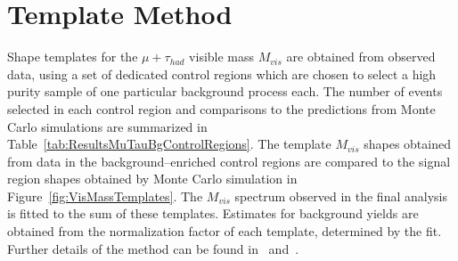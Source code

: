 \section{Template Method}
\label{sec:template}
%
Shape templates for the $\mu + \tau_{had}$ visible mass $M_{vis}$ are obtained
from observed data, using a set of dedicated control regions which are chosen to select a
high purity sample of one particular background process each.  The number of
events selected in each control region and comparisons to the predictions from
Monte Carlo simulations are summarized in
Table~\ref{tab:ResultsMuTauBgControlRegions}.  The template $M_{vis}$ shapes
obtained from data in the background--enriched control regions are compared to
the signal region shapes obtained by Monte Carlo simulation in
Figure~\ref{fig:VisMassTemplates}.  The $M_{vis}$ spectrum observed in the final
analysis is fitted to the sum of these templates.  Estimates for background
yields are obtained from the normalization factor of each template, determined
by the fit.  Further details of the method can be found
in~\cite{CMS_AN_2010-088} and~\cite{CMS_AN_2011-021}. 
%
